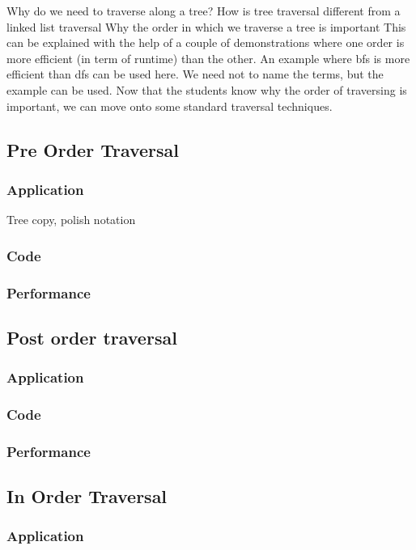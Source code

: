 \documentclass[12pt,a4paper]{article}
\begin{document}
Why do we need to traverse along a tree?
How is tree traversal different from a linked list traversal
Why the order in which we traverse a tree is important
This can be explained with the help of a couple of demonstrations where one order is more efficient (in term of runtime) than the other. An example where bfs is more efficient than dfs can be used here. We need not to name the terms, but the example can be used. 
Now that the students know why the order of traversing is important, we can move onto some standard traversal techniques. 

\subsection{Pre Order Traversal}
\subsubsection{Application}
Tree copy, polish notation
\subsubsection{Code}

\subsubsection{Performance}

\subsection{Post order traversal} 
\subsubsection{Application}

\subsubsection{Code}

\subsubsection{Performance}

\subsection{In Order Traversal}
\subsubsection{Application}
\end{document}
